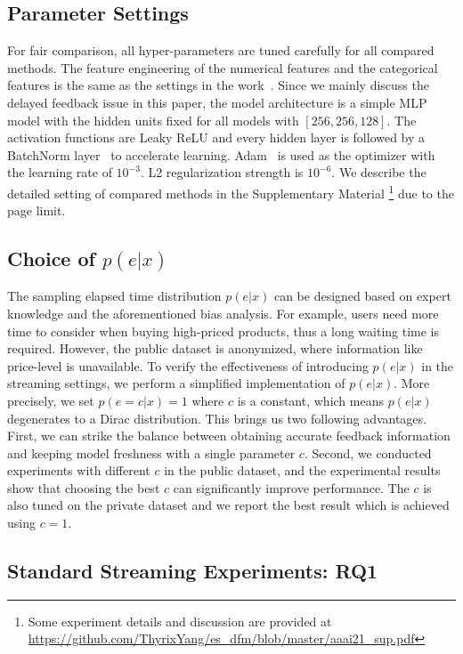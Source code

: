 \documentclass[letterpaper]{article} %
\begin{document}
\subsection{Parameter Settings}
For fair comparison, all hyper-parameters are tuned carefully for all compared methods. The feature engineering of the numerical features and the categorical features is the same as the settings in the work~\cite{DFM}. Since we mainly discuss the delayed feedback issue in this paper, the model architecture is a simple MLP model with the hidden units fixed for all models with $[256,256,128]$. The activation functions are Leaky ReLU and every hidden layer is followed by a BatchNorm layer~\cite{ioffe2015batch} to accelerate learning. Adam~\cite{kingma:adam} is used as the optimizer with the learning rate of $10^{-3}$. L2 regularization strength is $10^{-6}$. We describe the detailed setting of compared methods in the Supplementary Material \footnote{\label{supp}Some experiment details and discussion are provided at \url{https://github.com/ThyrixYang/es_dfm/blob/master/aaai21_sup.pdf}} due to the page limit.

\subsection{Choice of $p(e|x)$}
The sampling elapsed time distribution $p(e|x)$ can be designed based on expert knowledge and the aforementioned bias analysis. For example, users need more time to consider when buying high-priced products, thus a long waiting time is required. However, the public dataset is anonymized, where information like price-level is unavailable. To verify the effectiveness of introducing $p(e|x)$ in the streaming settings, we perform a simplified implementation of $p(e|x)$. More precisely, we set $p(e=c|x)=1$ where $c$ is a constant, which means $p(e|x)$ degenerates to a Dirac distribution. This brings us two following advantages. First, we can strike the balance between obtaining accurate feedback information and keeping model freshness with a single parameter $c$. Second, we conducted experiments with different $c$ in the public dataset, and the experimental results show that choosing the best $c$ can significantly improve performance. The $c$ is also tuned on the private dataset and we report the best result which is achieved using $c=1$.

\subsection{Standard Streaming Experiments: RQ1}
\end{document}
